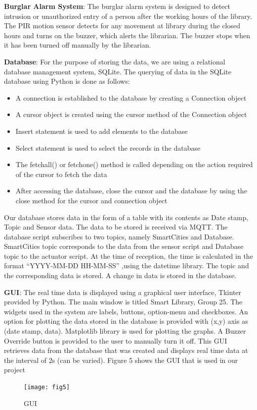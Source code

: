 \documentclass[runningheads]{llncs}
\begin{document}
\textbf{Burglar Alarm System}:
	The burglar alarm system is designed to detect intrusion or unauthorized entry of a person after the working hours of the library. The PIR motion sensor detects for any movement at library during the closed hours and turns on the buzzer, which alerts the librarian. The buzzer stops when it has been turned off manually by the librarian.

\textbf{Database}:
	For the purpose of storing the data, we are using a relational database management system, SQLite.
The querying of data in the SQLite database using Python is done as follows:
\begin{itemize}
\item A connection is established to the database by creating a Connection object
\item A cursor object is created using the cursor method of the Connection object
\item Insert statement is used to add elements to the database
\item Select statement is used to select the records in the database
\item The fetchall() or fetchone() method is called depending on the action required of the cursor to fetch the data
\item After accessing the database, close the cursor and the database by using the close method for the cursor and connection object
\end{itemize}
Our database stores data in the form of a table with its contents as Date stamp, Topic and Sensor data. The data to be stored is received via MQTT. The database script subscribes to two topics, namely SmartCities and Database. SmartCities topic corresponds to the data from the sensor script and Database topic to the actuator script. At the time of reception, the time is calculated in the format “YYYY-MM-DD HH-MM-SS” ,using the datetime library. The topic and the corresponding data is stored. A change in data is stored in the database.

\vspace{3mm}
\textbf{GUI}:
\vspace{3mm}
The real time data is displayed using a graphical user interface, Tkinter provided by Python. 
The main window is titled Smart Library, Group 25. The widgets used in the system are labels, buttons, option-menu and checkboxes. An option for plotting the data stored in the database is provided with (x,y) axis as (date stamp, data). Matplotlib library is used for plotting the graphs. A Buzzer Override button is provided to the user to manually turn it off. This GUI retrieves data from the database that was created and displays real time data at the interval of 2s (can be varied).
\newline Figure 5 shows the GUI that is used in our project 
\begin{figure}
\begin{center}
\texttt{[image: fig5]}
\caption{GUI}
\end{center}
\end{figure}
\end{document}
